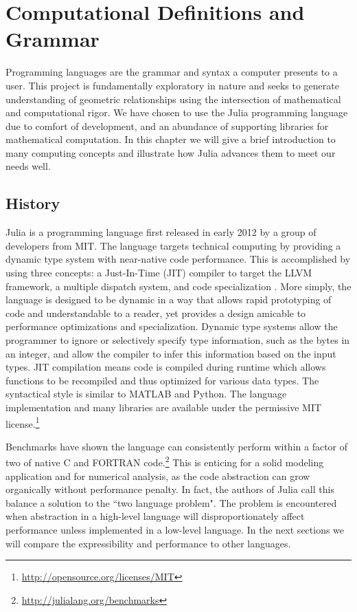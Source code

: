 \chapter{Computational Definitions and Grammar}

Programming languages are the grammar and syntax a computer presents to a user.
This project is fundamentally exploratory in nature and seeks to generate
understanding of geometric relationships using the intersection of
mathematical and computational rigor. We have chosen to use the Julia
programming language due to comfort of development, and an abundance of
supporting libraries for mathematical computation. In this chapter
we will give a brief introduction to many computing concepts and illustrate
how Julia advances them to meet our needs well.

\section{History}
Julia is a programming language first released in early 2012 by a group of
developers from MIT. The language targets technical computing by providing a
dynamic type system with near-native code performance. This is accomplished by
using three concepts: a Just-In-Time (JIT) compiler to target the LLVM framework,
a multiple dispatch system, and code specialization\cite{bezanson2012julia}
\cite{Bezanson_Edelman_Karpinski_Shah_2014}.
More simply, the language is designed to be dynamic in a way that allows
rapid prototyping of code and understandable to a reader, yet provides
a design amicable to performance optimizations and specialization.
Dynamic type systems allow the programmer to ignore or selectively
specify type information, such
as the bytes in an integer, and allow the compiler to infer this information
based on the input types. JIT compilation means code is compiled during runtime
which allows functions to be recompiled and thus optimized for various
data types.
The syntactical style is similar to MATLAB and Python.
The language implementation and many libraries are available under the
permissive MIT license.\footnote{\url{http://opensource.org/licenses/MIT}}

Benchmarks have shown the language can consistently perform within a factor of
two of native C and FORTRAN code.\footnote{\url{http://julialang.org/benchmarks}}
This is enticing for a solid modeling application and for numerical analysis,
as the code abstraction can grow organically without performance penalty.
In fact, the authors of Julia call this balance a solution to the 
``two language problem". The problem is encountered when abstraction in a
high-level language will disproportionately affect performance unless
implemented in a low-level language. In the next sections we will compare
the expressibility and performance to other languages.

